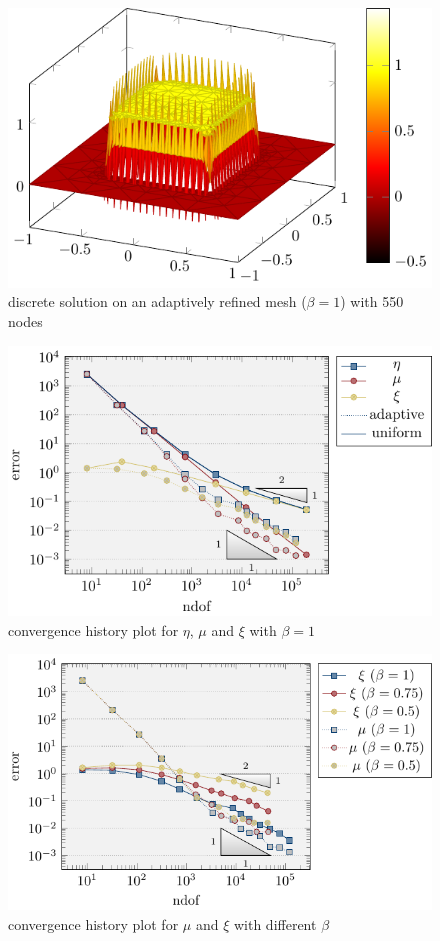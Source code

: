 \documentclass[11p]{article}
\begin{document}
	\begin{figure}[H]
		\centering
		\includegraphics[width=12cm]{figures/discSet/discSolution/discSolution.pdf}
		\caption{discrete solution on an adaptively refined mesh ($\beta = 1$) with 550 nodes}
	\end{figure}

	\begin{figure}[H]
		\centering
		\includegraphics[width=14cm]{figures/discSet/convHistoryPlot/convergence.pdf}
		\caption{convergence history plot for $\eta$, $\mu$ and $\xi$ with $\beta = 1$}
	\end{figure}

	\begin{figure}[H]
		\centering
		\includegraphics[width=14cm]{figures/discSet/compBeta/compBeta.pdf}
		\caption{convergence history plot for $\mu$ and $\xi$ with different $\beta$}
	\end{figure}
	
\end{document}
